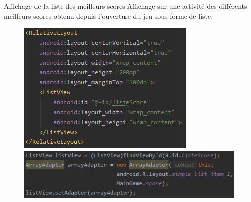\documentclass{beamer}
\begin{document}
\begin{frame}{Affichage de la liste des meilleurs scores}
    Affichage sur une activité des différents meilleurs scores obtenu depuis l'ouverture du jeu sous forme de liste.
    \begin{figure}
        \begin{minipage}[C]{0.5\linewidth}
            \includegraphics[scale=0.5]{RlLV.png}
        \end{minipage}\hfill
        \begin{minipage}[C]{0.5\linewidth}
            \includegraphics[scale=0.5]{CodeListView.png}
        \end{minipage}
    \end{figure}
\end{frame}
\end{document}
